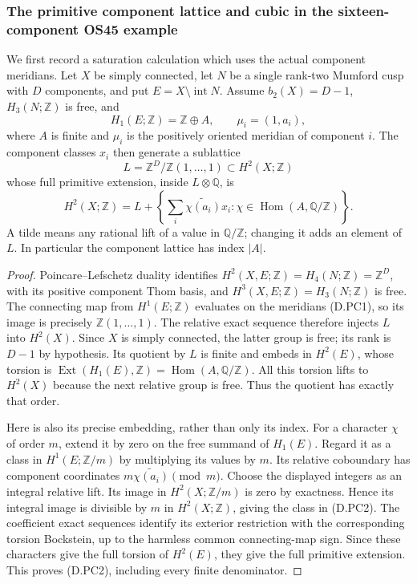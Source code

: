 \subsubsection*{The primitive component lattice and cubic in the sixteen-component OS45 example}
We first record a saturation calculation which uses the actual component
meridians. Let $X$ be simply connected, let $N$ be a single rank-two
Mumford cusp with $D$ components, and put $E=X\setminus\operatorname{int}N$.
Assume $b_2(X)=D-1$, $H_3(N;\mathbb Z)$ is free, and
\[
 H_1(E;\mathbb Z)=\mathbb Z\oplus A,\qquad
                       \mu_i=(1,a_i),                      \tag{D.PC1}
\]
where $A$ is finite and $\mu_i$ is the positively oriented meridian of
component $i$. The component classes $x_i$ then generate a sublattice
\[
 L=\mathbb Z^D/\mathbb Z(1,\ldots,1)
                       \subset H^2(X;\mathbb Z)
\]
whose full primitive extension, inside $L\otimes\mathbb Q$, is
\[
 H^2(X;\mathbb Z)
   =L+\left\{\sum_i\widetilde{\chi(a_i)}x_i:
                         \chi\in\operatorname{Hom}(A,\mathbb Q/\mathbb Z)
        \right\}.                                        \tag{D.PC2}
\]
A tilde means any rational lift of a value in $\mathbb Q/\mathbb Z$;
changing it adds an element of $L$. In particular the component
lattice has index $|A|$.

\begin{proof}
Poincare--Lefschetz duality identifies
$H^2(X,E;\mathbb Z)=H_4(N;\mathbb Z)=\mathbb Z^D$,
with its positive component Thom basis, and
$H^3(X,E;\mathbb Z)=H_3(N;\mathbb Z)$ is free. The connecting
map from $H^1(E;\mathbb Z)$ evaluates on the meridians (D.PC1),
so its image is precisely $\mathbb Z(1,\ldots,1)$.
The relative exact sequence therefore injects $L$ into $H^2(X)$.
Since $X$ is simply connected, the latter group is free; its rank is
$D-1$ by hypothesis. Its quotient by $L$ is finite and embeds in
$H^2(E)$, whose torsion is
$\operatorname{Ext}(H_1(E),\mathbb Z)=\operatorname{Hom}(A,\mathbb Q/\mathbb Z)$.
All this torsion lifts to $H^2(X)$ because the next relative group is
free. Thus the quotient has exactly that order.

Here is also its precise embedding, rather than only its index.
For a character $\chi$ of order $m$, extend it by zero on the free
summand of $H_1(E)$. Regard it as a class in
$H^1(E;\mathbb Z/m)$ by multiplying its values by $m$.
Its relative coboundary has component coordinates
$m\widetilde{\chi(a_i)}\pmod m$. Choose the displayed integers
as an integral relative lift. Its image in $H^2(X;\mathbb Z/m)$
is zero by exactness. Hence its integral image is divisible by $m$
in $H^2(X;\mathbb Z)$, giving the class in (D.PC2).
The coefficient exact sequences identify its exterior restriction
with the corresponding torsion Bockstein, up to the harmless common
connecting-map sign. Since these characters give the full torsion
of $H^2(E)$, they give the full primitive extension. This proves
(D.PC2), including every finite denominator.
\end{proof}


